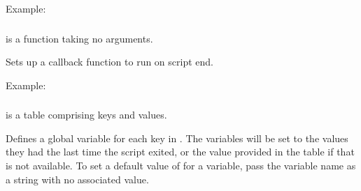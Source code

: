 \documentclass[letterpaper,10pt,english]{sphinxmanual}
\begin{document}
\sphinxAtStartPar
Example:

\begin{sphinxVerbatim}[commandchars=\\\{\}]
 
       

\end{sphinxVerbatim}


\subsubsection{}
\label{\detokenize{mods:emu-registerexit-func}}\label{\detokenize{mods:registerexit}}
\sphinxAtStartPar
{} is a function taking no arguments.

\sphinxAtStartPar
Sets up a callback function to run on script end.

\sphinxAtStartPar
Example:

\begin{sphinxVerbatim}[commandchars=\\\{\}]
 

\end{sphinxVerbatim}


\subsubsection{}
\label{\detokenize{mods:emu-persistglobalvariables-variabletable}}\label{\detokenize{mods:persistglobalvariables}}
\sphinxAtStartPar
{} is a table comprising keys and values.

\sphinxAtStartPar
Defines a global variable for each key in . The variables will be set to the values they had the last time the script exited, or the value provided in the table if that is not available.
To set a default value of  for a variable, pass the variable name as a string with no associated value.
\end{document}
